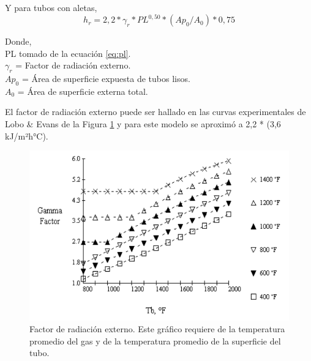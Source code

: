 \par Y para tubos con aletas,
\begin{equation}
h_r = 2,2 *\gamma_r *PL^{0,50} *(Ap_0/A_0) *0,75
\end{equation}

\par Donde,\\
PL tomado de la ecuación \ref{eq:pl}.\\
$\gamma_r$ = Factor de radiación externo.\\
$Ap_0$ = Área de superficie expuesta de tubos lisos.\\
$A_0$ = Área de superficie externa total. \\
\par El factor de radiación externo puede ser hallado en las curvas experimentales de Lobo \& Evans de la Figura \ref{fig:gamma} y para este modelo se aproximó a 2,2 * (3,6 kJ/m²h°C).
\begin{figure}[H]
\begin{center}
\includegraphics[scale=0.40]{images/gamma}
\caption[Factor de radiación externo]{Factor de radiación externo. Este gráfico requiere de la temperatura promedio del gas y de la temperatura promedio de la superficie del tubo.\cite{bib:rad}}
\label{fig:gamma}
\end{center}
\end{figure}

